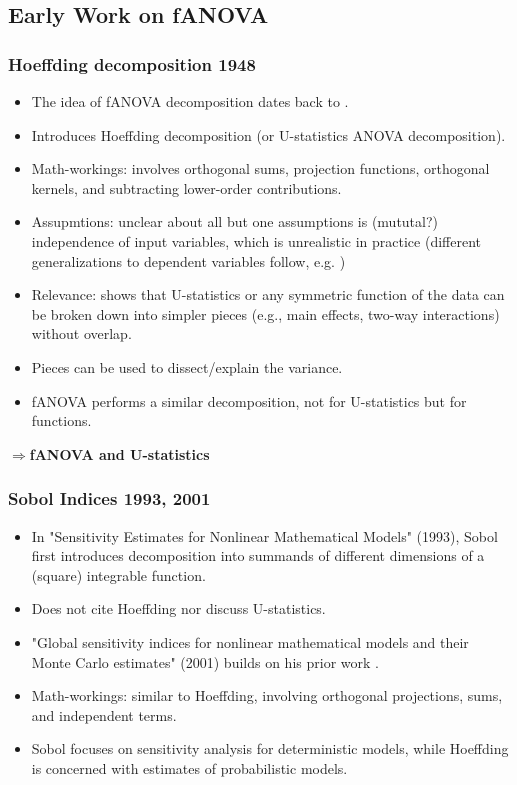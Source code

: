 
\subsection{Early Work on fANOVA}
\subsubsection*{Hoeffding decomposition 1948}
\begin{itemize}
    \item The idea of fANOVA decomposition dates back to \cite{hoeffding1948}.
    \item Introduces Hoeffding decomposition (or U-statistics ANOVA decomposition).
    \item Math-workings: involves orthogonal sums, projection functions, orthogonal kernels, and subtracting lower-order contributions.
    \item Assupmtions: unclear about all but one assumptions is (mututal?) independence of input variables, which is unrealistic in practice (different generalizations to dependent variables follow, e.g. \cite{ilidrissi2025})
    \item Relevance: shows that U-statistics or any symmetric function of the data can be broken down into simpler pieces (e.g., main effects, two-way interactions) without overlap.
    \item Pieces can be used to dissect/explain the variance.
    \item fANOVA performs a similar decomposition, not for U-statistics but for functions.
\end{itemize}
$\Rightarrow$\textbf{fANOVA and U-statistics}

\subsubsection*{Sobol Indices 1993, 2001}
\begin{itemize}
    \item In "Sensitivity Estimates for Nonlinear Mathematical Models" (1993), Sobol first introduces decomposition into summands of different dimensions of a (square) integrable function.
    \item Does not cite Hoeffding nor discuss U-statistics.
    \item "Global sensitivity indices for nonlinear mathematical models and their Monte Carlo estimates" (2001) builds on his prior work \citep{sobol2001}.
    \item Math-workings: similar to Hoeffding, involving orthogonal projections, sums, and independent terms.
    \item Sobol focuses on sensitivity analysis for deterministic models, while Hoeffding is concerned with estimates of probabilistic models.
\end{itemize}

